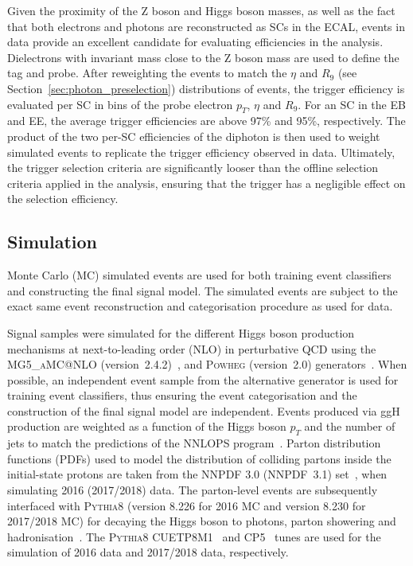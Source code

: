 Given the proximity of the Z boson and Higgs boson masses, as well as the fact that both electrons and photons are reconstructed as SCs in the ECAL, \Zee events in data provide an excellent candidate for evaluating efficiencies in the \Hgg analysis. Dielectrons with invariant mass close to the Z boson mass are used to define the tag and probe. After reweighting the \Zee events to match the $\eta$ and $R_9$ (see Section~\ref{sec:photon_preselection}) distributions of \Hgg events, the trigger efficiency is evaluated per SC in bins of the probe electron $p_T$, $\eta$ and $R_9$. For an SC in the EB and EE, the average trigger efficiencies are above 97\% and 95\%, respectively. The product of the two per-SC efficiencies of the diphoton is then used to weight simulated events to replicate the trigger efficiency observed in data.  Ultimately, the trigger selection criteria are significantly looser than the offline selection criteria applied in the \Hgg analysis, ensuring that the trigger has a negligible effect on the \Hgg selection efficiency.


\subsection{Simulation}\label{sec:hgg_simulation}
Monte Carlo (MC) simulated events are used for both training event classifiers and constructing the final signal model. The simulated events are subject to the exact same event reconstruction and categorisation procedure as used for data. 

Signal samples were simulated for the different Higgs boson production mechanisms at next-to-leading order (NLO) in perturbative QCD using the \textsc{MG5\_aMC@NLO} (version~2.4.2)~\cite{Alwall:2014hca}, and \textsc{Powheg} (version~2.0) generators~\cite{Nason:2004rx,Frixione:2007vw,Alioli:2008tz,Nason:2009ai,Alioli:2010xd,Hartanto:2015uka}. When possible, an independent event sample from the alternative generator is used for training event classifiers, thus ensuring the event categorisation and the construction of the final signal model are independent. Events produced via ggH production are weighted as a function of the Higgs boson $p_T$ and the number of jets to match the predictions of the NNLOPS program~\cite{Hamilton:2013fea}. Parton distribution functions (PDFs) used to model the distribution of colliding partons inside the initial-state protons are taken from the NNPDF 3.0 (NNPDF~3.1) set~\cite{Ball:2014uwa,Ball:2017nwa}, when simulating 2016 (2017/2018) data. The parton-level events are subsequently interfaced with \textsc{Pythia8} (version 8.226 for 2016 MC and version 8.230 for 2017/2018 MC) for decaying the Higgs boson to photons, parton showering and hadronisation~\cite{Sjostrand:2014zea}. The \textsc{Pythia8} CUETP8M1~\cite{Khachatryan:2015pea} and CP5~\cite{Sirunyan:2019dfx} tunes are used for the simulation of 2016 data and 2017/2018 data, respectively.

